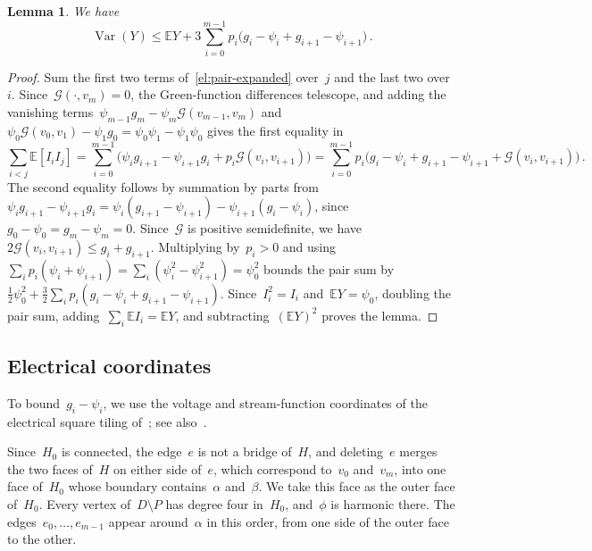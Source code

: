 \documentclass[11pt]{amsart}
\numberwithin{equation}{section}
\newtheorem{lemma}[equation]{Lemma}
\newcommand{\EE}{\mathbb E}
\begin{document}
\begin{lemma}\label{el:arc-moment}
We have
\begin{equation*}
 \operatorname{Var}(Y)\leq\EE Y+3\sum_{i=0}^{m-1}p_i\bigl(g_i-\psi_i+g_{i+1}-\psi_{i+1}\bigr)\,.
\end{equation*}
\end{lemma}

\begin{proof}
Sum the first two terms of~\eqref{el:pair-expanded} over~$j$ and the last two over~$i$. Since~$\mathcal G(\cdot,v_m)=0$, the Green-function differences telescope, and adding the vanishing terms~$\psi_{m-1}g_m-\psi_m\mathcal G(v_{m-1},v_m)$ and~$\psi_0\mathcal G(v_0,v_1)-\psi_1g_0=\psi_0\psi_1-\psi_1\psi_0$ gives the first equality in
\begin{equation*}
 \sum_{i<j}\EE[I_iI_j]
 =\sum_{i=0}^{m-1}\bigl(\psi_ig_{i+1}-\psi_{i+1}g_i+p_i\mathcal G(v_i,v_{i+1})\bigr)
 =\sum_{i=0}^{m-1}p_i\bigl(g_i-\psi_i+g_{i+1}-\psi_{i+1}+\mathcal G(v_i,v_{i+1})\bigr)\,.
\end{equation*}
The second equality follows by summation by parts from~$\psi_ig_{i+1}-\psi_{i+1}g_i=\psi_i(g_{i+1}-\psi_{i+1})-\psi_{i+1}(g_i-\psi_i)$, since~$g_0-\psi_0=g_m-\psi_m=0$. Since~$\mathcal G$ is positive semidefinite, we have~$2\mathcal G(v_i,v_{i+1})\leq g_i+g_{i+1}$. Multiplying by~$p_i>0$ and using~$\sum_ip_i(\psi_i+\psi_{i+1})=\sum_i(\psi_i^2-\psi_{i+1}^2)=\psi_0^2$ bounds the pair sum by~$\tfrac12\psi_0^2+\tfrac32\sum_ip_i(g_i-\psi_i+g_{i+1}-\psi_{i+1})$. Since~$I_i^2=I_i$ and~$\EE Y=\psi_0$, doubling the pair sum, adding~$\sum_i\EE I_i=\EE Y$, and subtracting~$(\EE Y)^2$ proves the lemma.
\end{proof}

\subsection{Electrical coordinates}

To bound~$g_i-\psi_i$, we use the voltage and stream-function coordinates of the electrical square tiling of~\citet*{BrooksSmithStoneTutte1940}; see also~\citet[Section~9.6]{LyonsPeres2016}.

Since~$H_0$ is connected, the edge~$e$ is not a bridge of~$H$, and deleting~$e$ merges the two faces of~$H$ on either side of~$e$, which correspond to~$v_0$ and~$v_m$, into one face of~$H_0$ whose boundary contains~$\alpha$ and~$\beta$. We take this face as the outer face of~$H_0$. Every vertex of~$D\setminus P$ has degree four in~$H_0$, and~$\phi$ is harmonic there. The edges~$e_0,\ldots,e_{m-1}$ appear around~$\alpha$ in this order, from one side of the outer face to the other.
\end{document}
